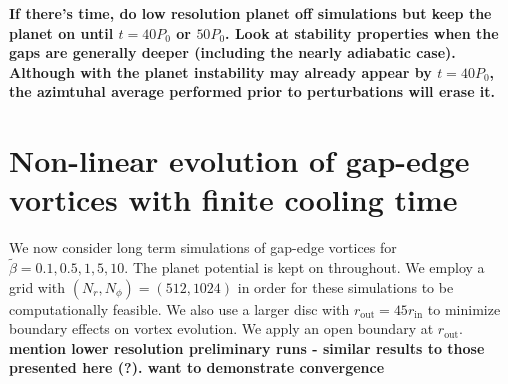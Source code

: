



{\bf
If there's time, do low resolution planet off simulations but keep the planet on
until $t=40P_0$ or $50P_0$. Look at stability properties when the gaps
are generally deeper (including the nearly adiabatic case). Although
with the planet instability may already appear by $t=40P_0$, the
azimtuhal average performed prior to perturbations will erase it. 
}



\section{Non-linear evolution of
  gap-edge vortices with finite cooling time} 

We now consider long term simulations of gap-edge vortices for
$\tilde{\beta}=0.1,0.5,1,5,10$. The planet potential is kept on
throughout.  
We employ a grid with $(N_r,N_{\phi})=(512,1024)$ 
in order for these simulations to be computationally feasible. We also use a larger
disc with $r_{\mathrm{out}}=45r_{\mathrm{in}}$ to minimize boundary
effects on vortex evolution. We apply an open boundary at
$r_\mathrm{out}$. {\bf mention lower resolution preliminary runs -
  similar results to those presented here (?). want to demonstrate convergence}



